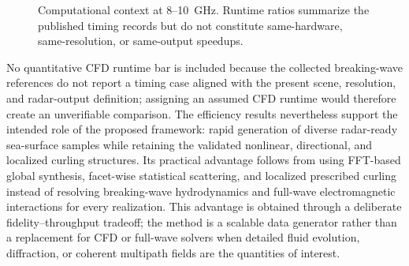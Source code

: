 \begin{figure}[!t]
\centering
{}
\caption{Computational context at 8--10~GHz. Runtime ratios summarize the published timing records but do not constitute same-hardware, same-resolution, or same-output speedups.}
\label{fig:xband_runtime_context}
\end{figure}

No quantitative CFD runtime bar is included because the collected breaking-wave references do not report a timing case aligned with the present scene, resolution, and radar-output definition; assigning an assumed CFD runtime would therefore create an unverifiable comparison. The efficiency results nevertheless support the intended role of the proposed framework: rapid generation of diverse radar-ready sea-surface samples while retaining the validated nonlinear, directional, and localized curling structures. Its practical advantage follows from using FFT-based global synthesis, facet-wise statistical scattering, and localized prescribed curling instead of resolving breaking-wave hydrodynamics and full-wave electromagnetic interactions for every realization. This advantage is obtained through a deliberate fidelity--throughput tradeoff; the method is a scalable data generator rather than a replacement for CFD or full-wave solvers when detailed fluid evolution, diffraction, or coherent multipath fields are the quantities of interest.
